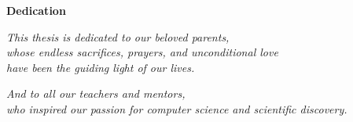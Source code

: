 \thispagestyle{empty}
\begin{center}
    \vspace*{4.0cm}
    {\fontsize{16pt}{20pt}\selectfont \textbf{Dedication} \par}
    \vspace{1.5cm}
    \textit{\large This thesis is dedicated to our beloved parents,\\
    whose endless sacrifices, prayers, and unconditional love\\
    have been the guiding light of our lives.}
    
    \vspace{1.0cm}
    \textit{\large And to all our teachers and mentors,\\
    who inspired our passion for computer science and scientific discovery.}
\end{center}
